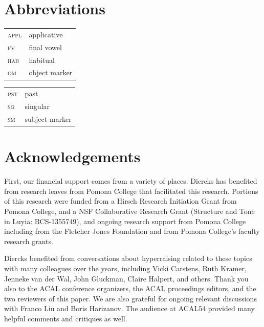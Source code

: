 \documentclass[output=paper,colorlinks,citecolor=brown
]{langscibook}
\begin{document}
\section*{Abbreviations}

\begin{tabularx}{.45\textwidth}{lQ}
\textsc{appl} & applicative\\
 \textsc{fv} & final vowel\\
 \textsc{hab} & habitual\\
 \textsc{om} & object marker\\
 \end{tabularx}
\begin{tabularx}{.45\textwidth}{lQ}
 \textsc{pst} & past\\
 \textsc{sg} & singular\\
 \textsc{sm} & subject marker
\end{tabularx}

\section*{Acknowledgements}

First, our financial support comes from a  variety of places. Diercks has benefited from research leaves from Pomona College that facilitated this research. Portions of this research were funded from a Hirsch Research Initiation Grant from Pomona College, and a NSF Collaborative Research Grant (Structure and Tone in Luyia: BCS-1355749), and ongoing research support from Pomona College including from the Fletcher Jones Foundation and from Pomona College's faculty research grants.

Diercks benefited from conversations about hyperraising related to these topics with many colleagues over the years, including Vicki Carstens, Ruth Kramer, Jenneke van der Wal, John Gluckman, Claire Halpert, and others. Thank you also to the ACAL conference organizers, the ACAL proceedings editors, and the two reviewers of this paper. We are also grateful for ongoing relevant discussions with Franco Liu and Boris Harizanov. The audience at ACAL54 provided many helpful comments and critiques as well. 

\sloppy %
\printbibliography[heading=subbibliography,notkeyword=this]
\end{document}
